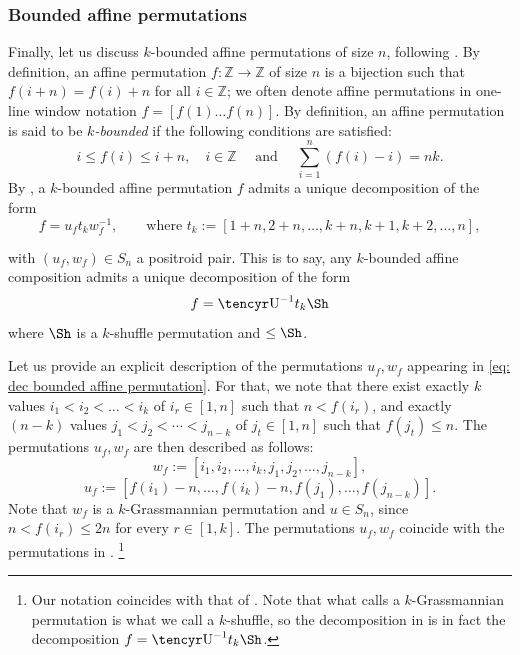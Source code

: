 \documentclass[10pt]{amsart}
\theoremstyle{plain}
\theoremstyle{definition}
\theoremstyle{remark}
\numberwithin{equation}{section}
\newcommand{\N}{\mathbb{N}}
\newcommand{\Z}{\mathbb{Z}}
\def\cyr{\tencyr\cyracc}
\begin{document}
\subsubsection{Bounded affine permutations}\label{ssec:boundedaffinepermutation}Finally, let us discuss  $k$-bounded affine permutations of size $n$, following \cite{KLS}. By definition, an affine permutation $f:\Z\to \Z$ of size $n$ is a bijection such that $f(i+n)=f(i)+n$ for all $i\in\Z$; we often denote affine permutations in one-line window notation $f=[f(1)\ldots f(n)]$. By definition, an affine permutation is said to be {\it $k$-bounded} if the following conditions are satisfied:
$$i\le f(i)\le i+n,\quad i\in\Z\quad\mbox{ and } \quad \sum_{i = 1}^{n}(f(i) - i) = nk.$$%
\noindent 
By \cite[Prop.~3.15]{KLS}, a $k$-bounded affine permutation $f$ admits a unique decomposition of the form
\begin{equation}\label{eq: dec bounded affine permutation}
f = u_ft_{k}w_f^{-1},\qquad \mbox{where }t_k:=[1 + n, 2+n, \dots, k+n, k+1, k+2, \dots, n],
\end{equation}

\noindent with $(u_f,w_f)\in S_n$ a positroid pair. This is to say, any $k$-bounded affine composition admits a unique decomposition of the form
\[
f = \mbox{\cyr{U}}^{-1}t_k\Sh
\]
where $\Sh$ is a $k$-shuffle permutation and {\cyr{U}} $\leq \Sh$.


Let us provide an explicit description of the permutations $u_f, w_f$ appearing in \eqref{eq: dec bounded affine permutation}. For that, we note that there exist exactly $k$ values $i_{1} < i_{2} < \ldots < i_{k}$ of $i_r\in[1,n]$ such that $n<f(i_r)$, and exactly $(n-k)$ values $j_{1} < j_{2} < \cdots < j_{n-k}$ of $j_t\in[1,n]$ such that $f(j_t) \leq n$. 
The permutations $u_f,w_f$ are then described as follows:
\begin{equation}
\label{eq: w from f}
w_f := [i_{1}, i_{2}, \dots, i_{k}, j_{1}, j_{2}, \dots, j_{n-k}],
\end{equation}
\begin{equation}
\label{eq: u from f}
u_f := [f(i_{1}) - n, \dots, f(i_{k}) - n, f(j_{1}), \dots, f(j_{n-k})].
\end{equation}
\noindent Note that $w_f$ is a $k$-Grassmannian permutation and $u \in S_{n}$, since $n < f(i_{r}) \leq 2n$ for every $r\in[1,k]$. The permutations $u_f,w_f$ %
coincide with the permutations  in \cite[Proposition 3.15]{KLS}. \footnote{Our notation coincides with that of \cite{KLS}. Note that what \cite{GL} calls a $k$-Grassmannian permutation is what we call a $k$-shuffle, so the decomposition in \cite[Proposition 4.2]{GL} is in fact the decomposition $f = \mbox{\cyr{U}}^{-1}t_k\Sh$.}
\end{document}
